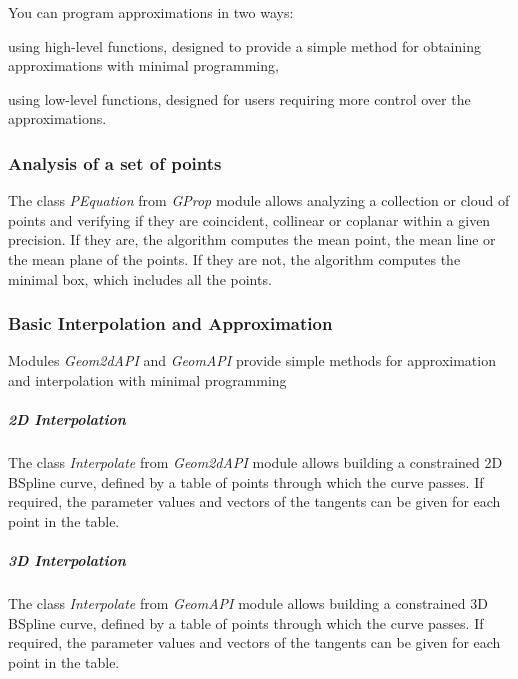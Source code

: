 You can program approximations in two ways\+:


\begin{DoxyItemize}
\item using high-\/level functions, designed to provide a simple method for obtaining approximations with minimal programming,
\item using low-\/level functions, designed for users requiring more control over the approximations.
\end{DoxyItemize}\hypertarget{occt_user_guides__modeling_data_occt_modat_1_1_1}{}\subsubsection{Analysis of a set of points}\label{occt_user_guides__modeling_data_occt_modat_1_1_1}
The class {\itshape P\+Equation} from {\itshape G\+Prop} module allows analyzing a collection or cloud of points and verifying if they are coincident, collinear or coplanar within a given precision. If they are, the algorithm computes the mean point, the mean line or the mean plane of the points. If they are not, the algorithm computes the minimal box, which includes all the points.\hypertarget{occt_user_guides__modeling_data_occt_modat_1_1_2}{}\subsubsection{Basic Interpolation and Approximation}\label{occt_user_guides__modeling_data_occt_modat_1_1_2}
Modules {\itshape Geom2d\+A\+PI} and {\itshape Geom\+A\+PI} provide simple methods for approximation and interpolation with minimal programming

\subparagraph*{2D Interpolation}

The class {\itshape Interpolate} from {\itshape Geom2d\+A\+PI} module allows building a constrained 2D B\+Spline curve, defined by a table of points through which the curve passes. If required, the parameter values and vectors of the tangents can be given for each point in the table.

\subparagraph*{3D Interpolation}

The class {\itshape Interpolate} from {\itshape Geom\+A\+PI} module allows building a constrained 3D B\+Spline curve, defined by a table of points through which the curve passes. If required, the parameter values and vectors of the tangents can be given for each point in the table.


